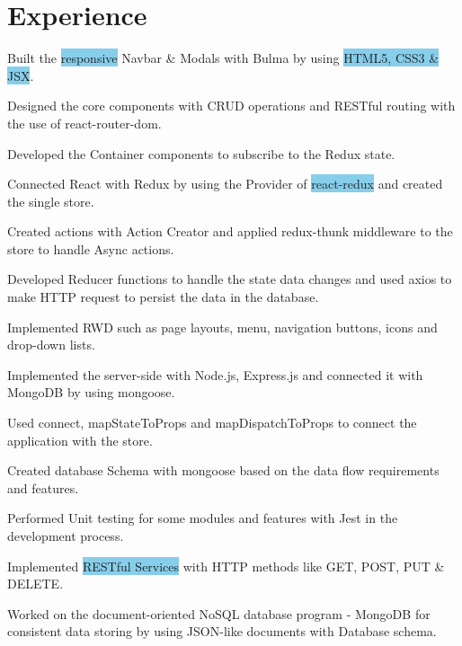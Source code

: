 \documentclass[letterpaper]{deedy-resume} %
\begin{document}
\hfill
%
%
\begin{minipage}[t]{0.66\textwidth} %

\section{Experience}

\vspace{\topsep} %
\vspace{\topsep}
\begin{tightitemize}
	\item Built the \colorbox{SkyBlue}{responsive} Navbar \& Modals with Bulma by using \colorbox{SkyBlue}{HTML5, CSS3 \& JSX}.
	\item Designed the core components with CRUD operations and RESTful routing with the use of react-router-dom.
	\item Developed the Container components to subscribe to the Redux state.
	\item Connected React with Redux by using the Provider of \colorbox{SkyBlue}{react-redux} and created the single store.
	\item Created actions with Action Creator and applied redux-thunk middleware to the store to handle Async actions.
	\item Developed Reducer functions to handle the state data changes and used axios to make HTTP request to persist the data in the database.
	\item Implemented RWD such as page layouts, menu, navigation buttons, icons and drop-down lists.
	\item Implemented the server-side with Node.js, Express.js and connected it with MongoDB by using mongoose.
	\item Used connect, mapStateToProps and mapDispatchToProps to connect the application with the store.
	\item Created database Schema with mongoose based on the data flow requirements and features.
	\item Performed Unit testing for some modules and features with Jest in the development process.
	\item Implemented \colorbox{SkyBlue}{RESTful Services} with HTTP methods like GET, POST, PUT \& DELETE.
	\item Worked on the document-oriented NoSQL database program - MongoDB for consistent data storing by using JSON-like documents with Database schema.
	

\end{tightitemize}
\end{minipage}
\end{document}
